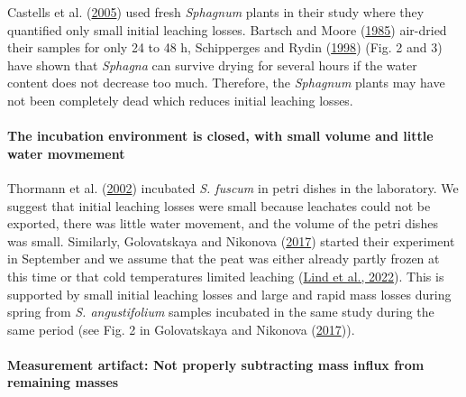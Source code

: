 \documentclass[
  12pt,
]{article}
\begin{document}
Castells et al. (\protect\hyperlink{ref-Castells.2005}{2005}) used fresh \emph{Sphagnum} plants in their study where they quantified only small initial leaching losses. Bartsch and Moore (\protect\hyperlink{ref-Bartsch.1985}{1985}) air-dried their samples for only 24 to 48 h, Schipperges and Rydin (\protect\hyperlink{ref-Schipperges.1998}{1998}) (Fig. 2 and 3) have shown that \emph{Sphagna} can survive drying for several hours if the water content does not decrease too much. Therefore, the \emph{Sphagnum} plants may have not been completely dead which reduces initial leaching losses.

\hypertarget{the-incubation-environment-is-closed-with-small-volume-and-little-water-movmement}{%
\paragraph*{The incubation environment is closed, with small volume and little water movmement}\label{the-incubation-environment-is-closed-with-small-volume-and-little-water-movmement}}

Thormann et al. (\protect\hyperlink{ref-Thormann.2002}{2002}) incubated \emph{S. fuscum} in petri dishes in the laboratory. We suggest that initial leaching losses were small because leachates could not be exported, there was little water movement, and the volume of the petri dishes was small. Similarly, Golovatskaya and Nikonova (\protect\hyperlink{ref-Golovatskaya.2017}{2017}) started their experiment in September and we assume that the peat was either already partly frozen at this time or that cold temperatures limited leaching (\protect\hyperlink{ref-Lind.2022}{Lind et al., 2022}). This is supported by small initial leaching losses and large and rapid mass losses during spring from \emph{S. angustifolium} samples incubated in the same study during the same period (see Fig. 2 in Golovatskaya and Nikonova (\protect\hyperlink{ref-Golovatskaya.2017}{2017})).

\hypertarget{measurement-artifact-not-properly-subtracting-mass-influx-from-remaining-masses}{%
\paragraph*{Measurement artifact: Not properly subtracting mass influx from remaining masses}\label{measurement-artifact-not-properly-subtracting-mass-influx-from-remaining-masses}}
\end{document}
